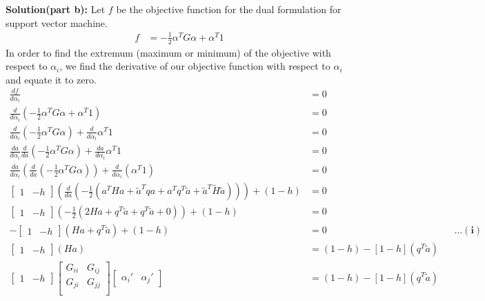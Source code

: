 \documentclass[10pt]{article}
\begin{document}
\textbf{Solution(part b):} Let $f$ be the objective function for the dual formulation for support vector machine.
\begin{align*}
f &= - \frac{1}{2} \alpha^T G \alpha + \alpha^T 1
\end{align*}
In order to find the extremum (maximum or minimum) of the objective with respect to $\alpha_{i}$, we find the derivative of our objective function with respect to $\alpha_{i}$ and equate it to zero.
\begin{align*}
\frac{df}{d\alpha_{i}} &= 0\\
\frac{d}{d\alpha_{i}} (-\frac{1}{2} \alpha^T G \alpha + \alpha^T 1) &= 0\\
\frac{d}{d\alpha_{i}} (-\frac{1}{2} \alpha^T G \alpha) + \frac{d}{d\alpha_{i}}\alpha^T 1 &= 0\\
\frac{da}{d\alpha_{i}} \frac{d}{da}(-\frac{1}{2} \alpha^T G \alpha) + \frac{da}{d\alpha_{i}}\alpha^T 1 &= 0 && \\
\frac{da}{d\alpha_{i}} (\frac{d}{da}(-\frac{1}{2} \alpha^T G \alpha)) + \frac{d}{d\alpha_{i}}(\alpha^T 1 ) &= 0\\
\begin{bmatrix}	1&-h \end{bmatrix} (\frac{d}{da}(-\frac{1}{2} (a^THa + \tilde{a}^Tqa + a^Tq^T\tilde{a} + \tilde{a}^T\tilde{H} \tilde{a}))) + (1-h) &= 0 \\
\begin{bmatrix}	1&-h \end{bmatrix} (-\frac{1}{2} (2Ha + q^T\tilde{a} + q^T\tilde{a} + 0)) + (1-h) &= 0\\
-\begin{bmatrix} 1&-h \end{bmatrix} (Ha+q^T\tilde{a}) + (1-h) &= 0 && \mathbf{...(i)}\\
\begin{bmatrix}	1&-h \end{bmatrix} (Ha) &= (1-h) - [1 -h](q^T\tilde{a})\\
\begin{bmatrix}	1&-h \end{bmatrix} \begin{bmatrix}	G_{ii}&G_{ij}\\G_{ji}&G_{jj} \\  \end{bmatrix} \begin{bmatrix}	\alpha_{i}'&\alpha_{j}' \end{bmatrix} &= (1-h) - [1 -h](q^T\tilde{a})\\

\end{align*}
\end{document}
